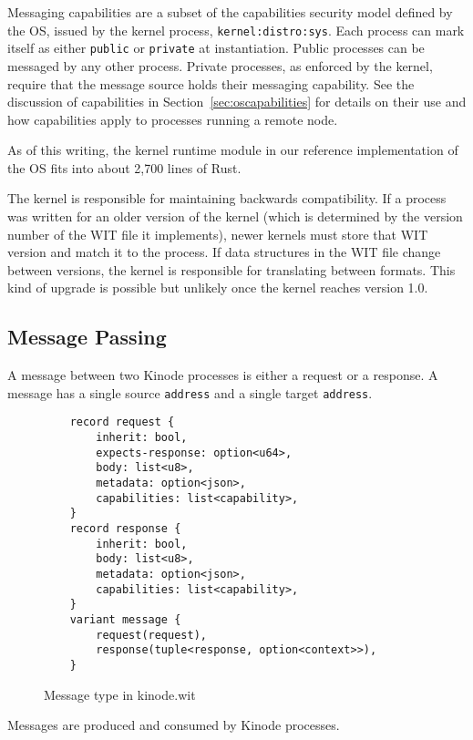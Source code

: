 \documentclass[runningheads]{llncs}
\begin{document}
Messaging capabilities are a subset of the capabilities security model defined by the OS, issued by the kernel process, \verb|kernel:distro:sys|.
Each process can mark itself as either \verb|public| or \verb|private| at instantiation.
Public processes can be messaged by any other process.
Private processes, as enforced by the kernel, require that the message source holds their messaging capability.
See the discussion of capabilities in Section~\ref{sec:oscapabilities} for details on their use and how capabilities apply to processes running a remote node.

As of this writing, the kernel runtime module in our reference implementation of the OS fits into about 2,700 lines of Rust.

The kernel is responsible for maintaining backwards compatibility.
If a process was written for an older version of the kernel (which is determined by the version number of the WIT file it implements), newer kernels must store that WIT version and match it to the process.
If data structures in the WIT file change between versions, the kernel is responsible for translating between formats.
This kind of upgrade is possible but unlikely once the kernel reaches version 1.0.

\subsection{Message Passing}
\label{sec:osmessagepassing}

A message between two Kinode processes is either a request or a response.
A message has a single source \verb|address| and a single target \verb|address|.

\begin{figure}[H]
    \centering
    \begin{verbatim}
    record request {
        inherit: bool,
        expects-response: option<u64>,
        body: list<u8>,
        metadata: option<json>,
        capabilities: list<capability>,
    }
    record response {
        inherit: bool,
        body: list<u8>,
        metadata: option<json>,
        capabilities: list<capability>,
    }
    variant message {
        request(request),
        response(tuple<response, option<context>>),
    }
    \end{verbatim}
    \caption{Message type in kinode.wit}
    \label{fig:WIT Types 2}
\end{figure}

Messages are produced and consumed by Kinode processes.
\end{document}
